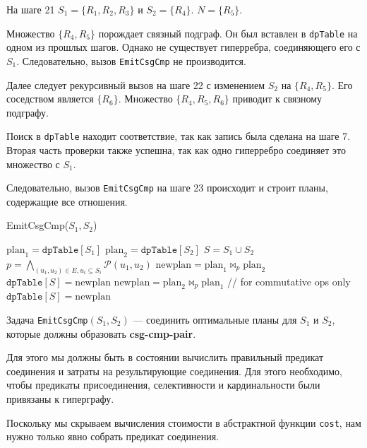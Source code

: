 \documentclass[12pt]{article}
\begin{document}
\begin{flushleft}
На шаге 21 
$S_1 = \{R_1, R_2, R_3\}$ и $S_2 = \{R_4\}$.  
$N = \{R_5\}$.  

Множество $\{R_4, R_5\}$ порождает связный подграф.  
Он был вставлен в \texttt{dpTable} на одном из прошлых шагов.  
Однако не существует гиперребра, соединяющего его с $S_1$.  
Следовательно, вызов \texttt{EmitCsgCmp} не производится.  

Далее следует рекурсивный вызов на шаге 22  
с изменением $S_2$ на $\{R_4, R_5\}$.  
Его соседством является $\{R_6\}$.  
Множество $\{R_4, R_5, R_6\}$ приводит к связному подграфу.  

Поиск в \texttt{dpTable} находит соответствие,  
так как запись была сделана на шаге 7.  
Вторая часть проверки также успешна,  
так как одно гиперребро соединяет это множество с $S_1$.  

Следовательно, вызов \texttt{EmitCsgCmp} на шаге 23 происходит  
и строит планы, содержащие все отношения.  

\begin{algorithm}
    EmitCsgCmp($S_1, S_2$)
    \begin{algorithmic}[1]
            \State $\text{plan}_1 = \texttt{dpTable}[S_1]$
            \State $\text{plan}_2 = \texttt{dpTable}[S_2]$
            \State $S = S_1 \cup S_2$
            \State $p = \bigwedge_{(u_1, u_2) \in E, u_i \subseteq S_i} \mathcal{P}(u_1, u_2)$
            \State $\text{newplan} = \text{plan}_1 \Join_p \text{plan}_2$
                \State $\texttt{dpTable}[S] = \text{newplan}$
            \EndIf
            \State $\text{newplan} = \text{plan}_2 \Join_p \text{plan}_1$ \quad // for commutative ops only
                \State $\texttt{dpTable}[S] = \text{newplan}$
            \EndIf
    \end{algorithmic}
\end{algorithm}

Задача \texttt{EmitCsgCmp}$(S_1, S_2)$ — соединить оптимальные планы  
для $S_1$ и $S_2$, которые должны образовать \textbf{csg-cmp-pair}.  

Для этого мы должны быть в состоянии вычислить  
правильный предикат соединения и затраты на результирующие соединения.  
Для этого необходимо, чтобы предикаты присоединения,  
селективности и кардинальности были привязаны к гиперграфу.  

Поскольку мы скрываем вычисления стоимости  
в абстрактной функции \texttt{cost},  
нам нужно только явно собрать предикат соединения.  


\end{flushleft}
\end{document}
